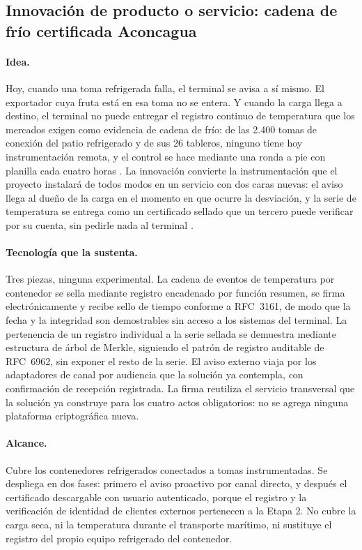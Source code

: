 \subsection{Innovación de producto o servicio: cadena de frío certificada
Aconcagua}

\paragraph*{Idea.}
Hoy, cuando una toma refrigerada falla, el terminal se avisa a sí mismo. El
exportador cuya fruta está en esa toma no se entera. Y cuando la carga llega a
destino, el terminal no puede entregar el registro continuo de temperatura que
los mercados exigen como evidencia de cadena de frío: de las 2.400 tomas de
conexión del patio refrigerado y de sus 26 tableros, ninguno tiene hoy
instrumentación remota, y el control se hace mediante una ronda a pie con
planilla cada cuatro horas \Hecho. La innovación convierte la instrumentación que el proyecto
instalará de todos modos en un servicio con dos caras nuevas: el aviso llega al
dueño de la carga en el momento en que ocurre la desviación, y la serie de
temperatura se entrega como un certificado sellado que un tercero puede
verificar por su cuenta, sin pedirle nada al terminal \Propuesta.

\paragraph*{Tecnología que la sustenta.}
Tres piezas, ninguna experimental. La cadena de eventos de temperatura por
contenedor se sella mediante registro encadenado por función resumen, se firma
electrónicamente y recibe sello de tiempo conforme a RFC~3161, de modo que la
fecha y la integridad son demostrables sin acceso a los sistemas del terminal.
La pertenencia de un registro individual a la serie sellada se demuestra
mediante estructura de árbol de Merkle, siguiendo el patrón de registro
auditable de RFC~6962, sin exponer el resto de la serie. El aviso externo viaja
por los adaptadores de canal por audiencia que la solución ya contempla, con
confirmación de recepción registrada. La firma reutiliza el servicio
transversal que la solución ya construye para los cuatro actos obligatorios: no
se agrega ninguna plataforma criptográfica nueva.

\paragraph*{Alcance.}
Cubre los contenedores refrigerados conectados a tomas instrumentadas. Se
despliega en dos fases: primero el aviso proactivo por canal directo, y después
el certificado descargable con usuario autenticado, porque el registro y la
verificación de identidad de clientes externos pertenecen a la Etapa 2. No
cubre la carga seca, ni la temperatura durante el transporte marítimo, ni
sustituye el registro del propio equipo refrigerado del contenedor.

